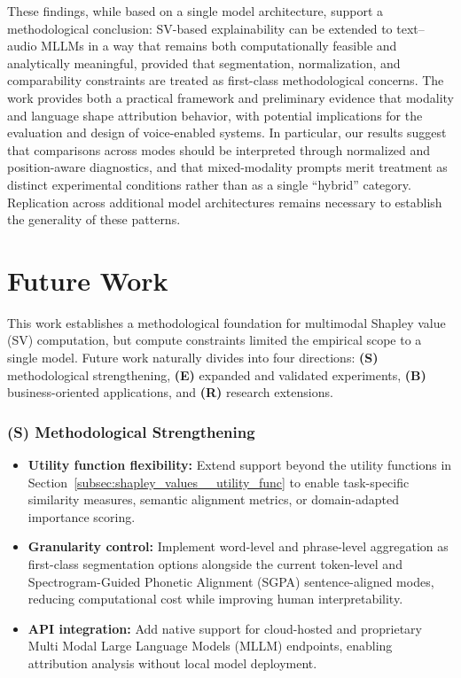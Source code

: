 These findings, while based on a single model architecture, support a methodological conclusion: SV-based explainability can be extended to text–audio MLLMs in a way that remains both computationally feasible and analytically meaningful, provided that segmentation, normalization, and comparability constraints are treated as first-class methodological concerns. The work provides both a practical framework and preliminary evidence that modality and language shape attribution behavior, with potential implications for the evaluation and design of voice-enabled systems. In particular, our results suggest that comparisons across modes should be interpreted through normalized and position-aware diagnostics, and that mixed-modality prompts merit treatment as distinct experimental conditions rather than as a single ``hybrid'' category. Replication across additional model architectures remains necessary to establish the generality of these patterns.

\chapter{Future Work}
\label{sec:future_work}

This work establishes a methodological foundation for multimodal Shapley value (SV) computation, but compute constraints limited the empirical scope to a single model. Future work naturally divides into four directions: \textbf{(S)} methodological strengthening, \textbf{(E)} expanded and validated experiments, \textbf{(B)} business-oriented applications, and \textbf{(R)} research extensions.

\subsection*{(S) Methodological Strengthening}

\begin{itemize}
\item \textbf{Utility function flexibility:}
Extend support beyond the utility functions in Section~\ref{subsec:shapley_values__utility_func} to enable task-specific similarity measures, semantic alignment metrics, or domain-adapted importance scoring.

\item \textbf{Granularity control:}
Implement word-level and phrase-level aggregation as first-class segmentation options alongside the current token-level and Spectrogram-Guided Phonetic Alignment (SGPA) sentence-aligned modes, reducing computational cost while improving human interpretability.

\item \textbf{API integration:}
Add native support for cloud-hosted and proprietary Multi Modal Large Language Models (MLLM) endpoints, enabling attribution analysis without local model deployment.
\end{itemize}

